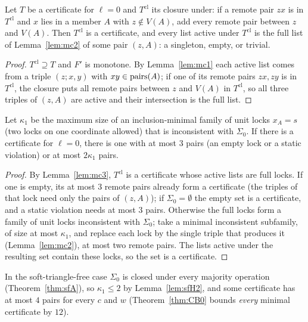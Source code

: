 \begin{lemma}[Strengthening]\label{lem:mc3}
Let $T$ be a certificate for $\ell=0$ and $T^{\mathrm{cl}}$ its closure under: if a remote pair $zx$ is in $T^{\mathrm{cl}}$ and $x$ lies in a member $A$ with $z\notin V(A)$, add every remote pair between $z$ and $V(A)$. Then $T^{\mathrm{cl}}$ is a certificate, and every list active under $T^{\mathrm{cl}}$ is the full list of Lemma~\ref{lem:mc2} of some pair $(z,A)$: a singleton, empty, or trivial.
\end{lemma}
\begin{proof}
$T^{\mathrm{cl}}\supseteq T$ and $F'$ is monotone. By Lemma~\ref{lem:mc1} each active list comes from a triple $(z;x,y)$ with $xy\in\mathrm{pairs}(A)$; if one of its remote pairs $zx,zy$ is in $T^{\mathrm{cl}}$, the closure puts all remote pairs between $z$ and $V(A)$ in $T^{\mathrm{cl}}$, so all three triples of $(z,A)$ are active and their intersection is the full list.
\end{proof}

\begin{theorem}\label{thm:R0}
Let $\kappa_1$ be the maximum size of an inclusion-minimal family of unit locks $x_A=s$ (two locks on one coordinate allowed) that is inconsistent with $\Sigma_0$. If there is a certificate for $\ell=0$, there is one with at most $3$ pairs (an empty lock or a static violation) or at most $2\kappa_1$ pairs.
\end{theorem}
\begin{proof}
By Lemma~\ref{lem:mc3}, $T^{\mathrm{cl}}$ is a certificate whose active lists are full locks. If one is empty, its at most $3$ remote pairs already form a certificate (the triples of that lock need only the pairs of $(z,A)$); if $\Sigma_0=\emptyset$ the empty set is a certificate, and a static violation needs at most $3$ pairs. Otherwise the full locks form a family of unit locks inconsistent with $\Sigma_0$; take a minimal inconsistent subfamily, of size at most $\kappa_1$, and replace each lock by the single triple that produces it (Lemma~\ref{lem:mc2}), at most two remote pairs. The lists active under the resulting set contain these locks, so the set is a certificate.
\end{proof}
In the soft-triangle-free case $\Sigma_0$ is closed under every majority operation (Theorem~\ref{thm:sfA}), so $\kappa_1\le2$ by Lemma~\ref{lem:sfH2}, and some certificate has at most $4$ pairs for every $c$ and $w$ (Theorem~\ref{thm:CB0} bounds \emph{every} minimal certificate by $12$).

